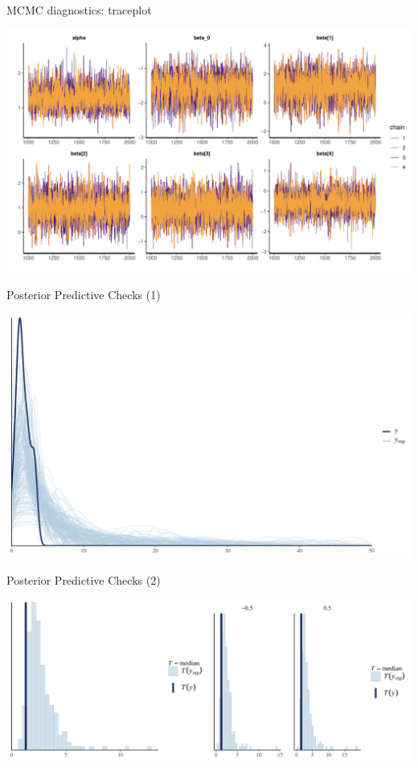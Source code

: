 \documentclass[ignorenonframetext,a4paper]{beamer}
\begin{document}
\begin{frame}{MCMC diagnostics: traceplot}

\includegraphics{DB_presentation_case_study_files/figure-beamer/unnamed-chunk-11-1.pdf}

\end{frame}

\begin{frame}{Posterior Predictive Checks (1)}

\includegraphics{DB_presentation_case_study_files/figure-beamer/unnamed-chunk-12-1.pdf}

\end{frame}

\begin{frame}{Posterior Predictive Checks (2)}

\includegraphics{DB_presentation_case_study_files/figure-beamer/unnamed-chunk-13-1.pdf}

\end{frame}
\end{document}
